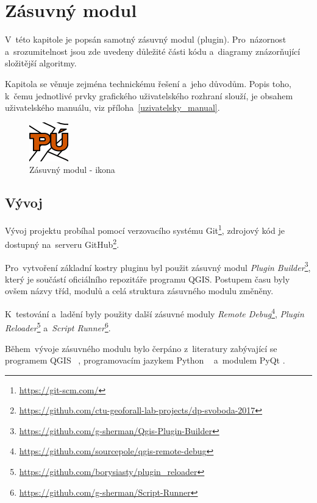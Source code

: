 \chapter{Zásuvný modul}
\label{plugin}

V~této kapitole je popsán samotný zásuvný modul (plugin). Pro~názornost a~srozumitelnost jsou zde uvedeny důležité části kódu a~diagramy znázorňující složitější algoritmy.

Kapitola se věnuje zejména technickému řešení a~jeho důvodům. Popis toho, k~čemu jednotlivé prvky grafického uživatelského rozhraní slouží, je obsahem uživatelského manuálu, viz příloha~\ref{uzivatelsky_manual}.

	\begin{figure}[H]
		\centering
		\includegraphics[width=.1\textwidth]{./pictures/puplugin.png}
		\caption[Zásuvný modul - ikona]{Zásuvný modul - ikona}
		\label{fig:ikona_pluginu}
 	\end{figure}

\section{Vývoj}
\label{vyvoj}

Vývoj projektu probíhal pomocí verzovacího systému Git\footnote{\url{https://git-scm.com/}}, zdrojový kód je dostupný na~serveru GitHub\footnote{\url{https://github.com/ctu-geoforall-lab-projects/dp-svoboda-2017}}.

Pro~vytvoření základní kostry pluginu byl použit zásuvný modul \textit{Plugin Builder}\footnote{\url{https://github.com/g-sherman/Qgis-Plugin-Builder}}, který je součástí oficiálního repozitáře programu QGIS. Postupem času byly ovšem názvy tříd, modulů a celá struktura zásuvného modulu změněny.

K~testování a~ladění byly použity další zásuvné moduly \textit{Remote Debug}\footnote{\url{https://github.com/sourcepole/qgis-remote-debug}}, \textit{Plugin Reloader}\footnote{\url{https://github.com/borysiasty/plugin_reloader}} a~\textit{Script Runner}\footnote{\url{https://github.com/g-sherman/Script-Runner}}.

Během~vývoje zásuvného modulu bylo čerpáno z~literatury zabývající se programem QGIS \citep{qgis_book}~\citep{pyqgis_book}, programovacím jazykem Python \citep{python3_oop_book}~\citep{dive_into_python} a~modulem PyQt \citep{pyqt_book}.

